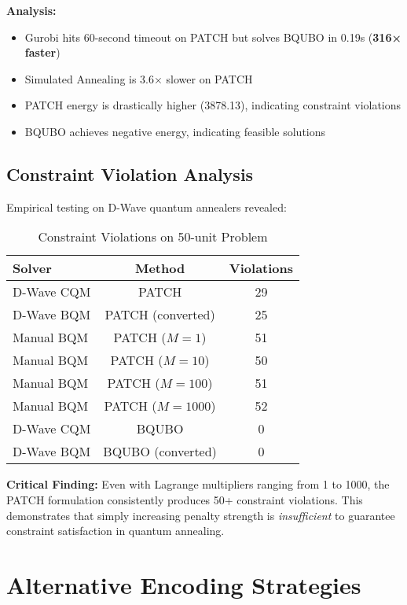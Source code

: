 \documentclass[11pt,a4paper]{article}
\begin{document}
\textbf{Analysis:}
\begin{itemize}
    \item Gurobi hits 60-second timeout on PATCH but solves BQUBO in 0.19s (\textbf{316× faster})
    \item Simulated Annealing is 3.6× slower on PATCH
    \item PATCH energy is drastically higher (3878.13), indicating constraint violations
    \item BQUBO achieves negative energy, indicating feasible solutions
\end{itemize}

\subsection{Constraint Violation Analysis}

Empirical testing on D-Wave quantum annealers revealed:

\begin{table}[h]
\centering
\caption{Constraint Violations on 50-unit Problem}
\label{tab:violations}
\begin{tabular}{@{}lcc@{}}
\toprule
\textbf{Solver} & \textbf{Method} & \textbf{Violations} \\
\midrule
D-Wave CQM & PATCH & 29 \\
D-Wave BQM & PATCH (converted) & 25 \\
Manual BQM & PATCH ($M=1$) & 51 \\
Manual BQM & PATCH ($M=10$) & 50 \\
Manual BQM & PATCH ($M=100$) & 51 \\
Manual BQM & PATCH ($M=1000$) & 52 \\
\midrule
D-Wave CQM & BQUBO & 0 \\
D-Wave BQM & BQUBO (converted) & 0 \\
\bottomrule
\end{tabular}
\end{table}

\textbf{Critical Finding:} Even with Lagrange multipliers ranging from 1 to 1000, the PATCH formulation consistently produces 50+ constraint violations. This demonstrates that simply increasing penalty strength is \emph{insufficient} to guarantee constraint satisfaction in quantum annealing.

\section{Alternative Encoding Strategies}
\end{document}
